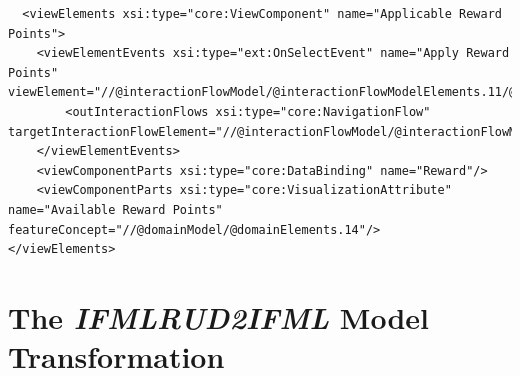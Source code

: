 \vspace{0.5cm}
\lstset{language=XML}
\begin{lstlisting} 
  <viewElements xsi:type="core:ViewComponent" name="Applicable Reward Points">
    <viewElementEvents xsi:type="ext:OnSelectEvent" name="Apply Reward Points" viewElement="//@interactionFlowModel/@interactionFlowModelElements.11/@viewElements.2/@viewElements.3">
        <outInteractionFlows xsi:type="core:NavigationFlow" targetInteractionFlowElement="//@interactionFlowModel/@interactionFlowModelElements.18/@actionEvents.0"/>
    </viewElementEvents>
    <viewComponentParts xsi:type="core:DataBinding" name="Reward"/>
    <viewComponentParts xsi:type="core:VisualizationAttribute"  name="Available Reward Points" featureConcept="//@domainModel/@domainElements.14"/>
</viewElements>
\end{lstlisting}
\vspace{0.5cm}

\newpage
\section{The \textit{IFMLRUD2IFML} Model Transformation}

